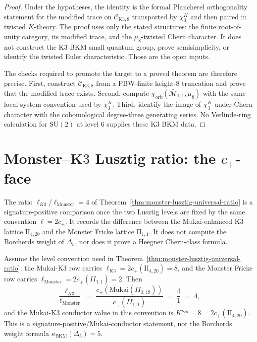 \begin{proof}
Under the hypotheses, the identity is the formal Plancherel
orthogonality statement for the modified trace on
$\mathcal C_{\mathrm{K3},8}$ transported by $\chi_3^K$ and then
paired in twisted $K$-theory. The proof uses only the stated
structures: the finite root-of-unity category, its modified trace,
and the $\mu_8$-twisted Chern character. It does not construct the
K3 BKM small quantum group, prove semisimplicity, or identify the
twisted Euler characteristic. Those are the open inputs.

The checks required to promote the target to a proved theorem are
therefore precise. First, construct
$\mathcal C_{\mathrm{K3},8}$ from a PBW-finite height-$8$ truncation
and prove that the modified trace exists. Second, compute
$\chi_{\mathrm{orb}}(\bar{\mathcal M}_{1,1},\mu_8)$ with the same
local-system convention used by $\chi_3^K$. Third, identify the image
of $\chi_3^K$ under Chern character with the cohomological
degree-three generating series. No Verlinde-ring calculation for
$\mathrm{SU}(2)$ at level $6$ supplies these K3 BKM data.
\end{proof}

\section{Monster--K$3$ Lusztig ratio: the $c_+$-face}
\label{sec:monster-k3-lusztig-cplus-face}

The ratio $\ell_{K3}/\ell_{\mathrm{Monster}} = 4$ of
Theorem~\ref{thm:monster-lusztig-universal-ratio} is a
signature-positive comparison once the two Lusztig levels are fixed
by the same convention $\ell=2c_+$. It records the difference between
the Mukai-enhanced K$3$ lattice $\mathrm{II}_{4,20}$ and the Monster
Fricke lattice $\mathrm{II}_{1,1}$. It does not compute the
Borcherds weight of $\Delta_5$, nor does it prove a Heegner
Chern-class formula.

\begin{theorem}
\label{thm:monster-k3-lusztig-cplus-face}
%
%
%
Assume the level convention used in
Theorem~\ref{thm:monster-lusztig-universal-ratio}: the Mukai-K$3$
row carries $\ell_{K3}=2c_+(\mathrm{II}_{4,20})=8$, and the Monster
Fricke row carries $\ell_{\mathrm{Monster}}=2c_+(II_{1,1})=2$. Then
\begin{equation}\label{eq:monster-k3-lusztig-cplus-face}
 \frac{\ell_{K3}}{\ell_{\mathrm{Monster}}}
 \;=\;
 \frac{c_+(\mathrm{Mukai}(II_{3, 19}))}{c_+(II_{1, 1})}
 \;=\;
 \frac{4}{1}
 \;=\;
 4,
\end{equation}
and the Mukai-K$3$ conductor value in this convention is
$K^{\kappa_{\mathrm{ch}}}=8=2c_+(\mathrm{II}_{4,20})$. This is a
signature-positive/Mukai-conductor statement, not the Borcherds
weight formula $\kappa_{\mathrm{BKM}}(\Delta_5)=5$.
\end{theorem}

